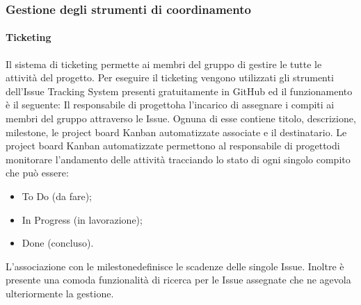 		\subsubsection{Gestione degli strumenti di coordinamento}
			\paragraph*{Ticketing}
				Il sistema di ticketing permette ai membri del gruppo di gestire le tutte le attività del progetto\glo.
				Per eseguire il ticketing vengono utilizzati gli strumenti dell'Issue Tracking System presenti gratuitamente in GitHub ed il funzionamento è il seguente:
				Il responsabile di progetto\glosp ha l'incarico di assegnare i compiti ai membri del gruppo attraverso le Issue. Ognuna di esse contiene titolo, descrizione, milestone, le project board Kanban automatizzate associate e il destinatario.
				Le project board Kanban automatizzate permettono al responsabile di progetto\glosp di monitorare l'andamento delle attività tracciando lo stato di ogni singolo compito che può essere:
				\begin{itemize}
					\item To Do (da fare);
					\item In Progress (in lavorazione);
					\item Done (concluso).
				\end{itemize}
				L'associazione con le milestone\glosp definisce le scadenze delle singole Issue.
				Inoltre è presente una comoda funzionalità di ricerca per le Issue assegnate che ne agevola ulteriormente la gestione.
